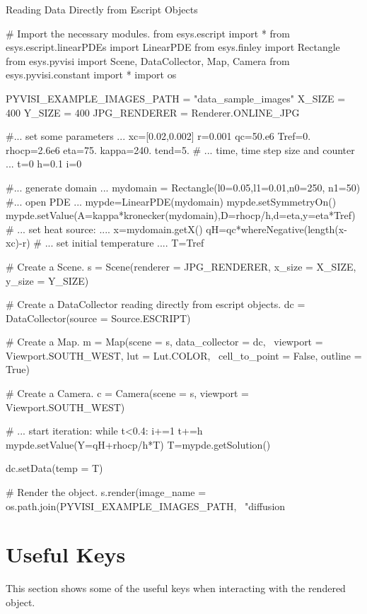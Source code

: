 \textsf{Reading Data Directly from Escript Objects}

\begin{python}
# Import the necessary modules.
from esys.escript import *
from esys.escript.linearPDEs import LinearPDE
from esys.finley import Rectangle
from esys.pyvisi import Scene, DataCollector, Map, Camera
from esys.pyvisi.constant import *
import os

PYVISI_EXAMPLE_IMAGES_PATH = "data_sample_images"
X_SIZE = 400
Y_SIZE = 400
JPG_RENDERER = Renderer.ONLINE_JPG

#... set some parameters ...
xc=[0.02,0.002]
r=0.001
qc=50.e6
Tref=0.
rhocp=2.6e6
eta=75.
kappa=240.
tend=5.
# ... time, time step size and counter ...
t=0
h=0.1
i=0

#... generate domain ...
mydomain = Rectangle(l0=0.05,l1=0.01,n0=250, n1=50)
#... open PDE ...
mypde=LinearPDE(mydomain)
mypde.setSymmetryOn()
mypde.setValue(A=kappa*kronecker(mydomain),D=rhocp/h,d=eta,y=eta*Tref)
# ... set heat source: ....
x=mydomain.getX()
qH=qc*whereNegative(length(x-xc)-r)
# ... set initial temperature ....
T=Tref

# Create a Scene.
s = Scene(renderer = JPG_RENDERER, x_size = X_SIZE, y_size = Y_SIZE)

# Create a DataCollector reading directly from escript objects.
dc = DataCollector(source = Source.ESCRIPT)

# Create a Map.
m = Map(scene = s, data_collector = dc, \
        viewport = Viewport.SOUTH_WEST, lut = Lut.COLOR, \
        cell_to_point = False, outline = True)

# Create a Camera.
c = Camera(scene = s, viewport = Viewport.SOUTH_WEST)

# ... start iteration:
while t<0.4:
      i+=1
      t+=h
      mypde.setValue(Y=qH+rhocp/h*T)
      T=mypde.getSolution()

      dc.setData(temp = T)
      
      # Render the object.
      s.render(image_name = os.path.join(PYVISI_EXAMPLE_IMAGES_PATH, \
              "diffusion%
\end{python}

\newpage

\section{Useful Keys}
This section shows some of the useful keys when interacting with the rendered
object.

